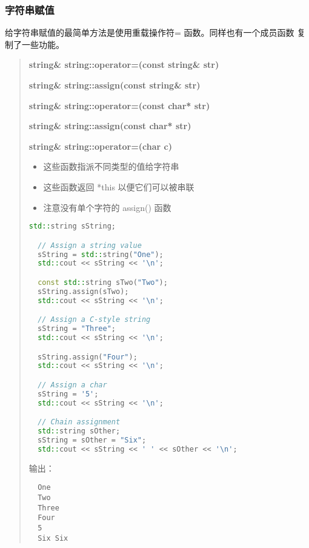 \documentclass[../../LearnCpp.tex]{subfiles}
\begin{document}

\subsubsection*{字符串赋值}

给字符串赋值的最简单方法是使用重载操作符= 函数。同样也有一个成员函数  复制了一些功能。

\begin{quotation}
  \textbf{string\& string::operator=(const string\& str)}

  \textbf{string\& string::assign(const string\& str)}

  \textbf{string\& string::operator=(const char* str)}

  \textbf{string\& string::assign(const char* str)}

  \textbf{string\& string::operator=(char c)}

  \begin{itemize}
    \item 这些函数指派不同类型的值给字符串
    \item 这些函数返回 *this 以便它们可以被串联
    \item 注意没有单个字符的 assign() 函数
  \end{itemize}

  \begin{lstlisting}[language=C++]
  std::string sString;

  // Assign a string value
  sString = std::string("One");
  std::cout << sString << '\n';

  const std::string sTwo("Two");
  sString.assign(sTwo);
  std::cout << sString << '\n';

  // Assign a C-style string
  sString = "Three";
  std::cout << sString << '\n';

  sString.assign("Four");
  std::cout << sString << '\n';

  // Assign a char
  sString = '5';
  std::cout << sString << '\n';

  // Chain assignment
  std::string sOther;
  sString = sOther = "Six";
  std::cout << sString << ' ' << sOther << '\n';
  \end{lstlisting}

  输出：

  \begin{lstlisting}
  One
  Two
  Three
  Four
  5
  Six Six
  \end{lstlisting}
\end{quotation}
\end{document}
